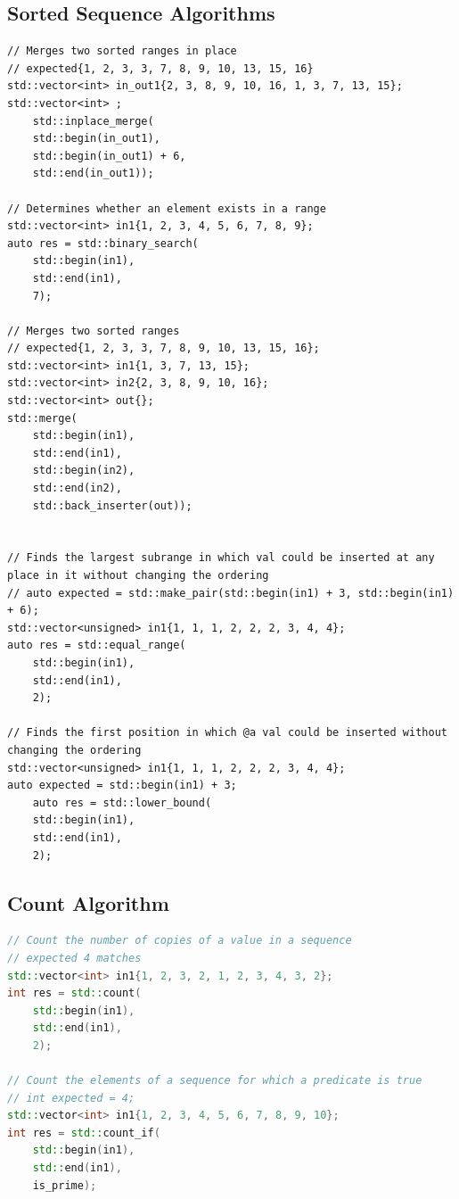 \subsection{Sorted Sequence Algorithms}
\begin{lstlisting}
// Merges two sorted ranges in place
// expected{1, 2, 3, 3, 7, 8, 9, 10, 13, 15, 16}
std::vector<int> in_out1{2, 3, 8, 9, 10, 16, 1, 3, 7, 13, 15};
std::vector<int> ;
	std::inplace_merge(
	std::begin(in_out1),
	std::begin(in_out1) + 6,
	std::end(in_out1));

// Determines whether an element exists in a range
std::vector<int> in1{1, 2, 3, 4, 5, 6, 7, 8, 9};
auto res = std::binary_search(
	std::begin(in1),
	std::end(in1),
	7);

// Merges two sorted ranges
// expected{1, 2, 3, 3, 7, 8, 9, 10, 13, 15, 16};
std::vector<int> in1{1, 3, 7, 13, 15};
std::vector<int> in2{2, 3, 8, 9, 10, 16};
std::vector<int> out{};
std::merge(
	std::begin(in1),
	std::end(in1),
	std::begin(in2),
	std::end(in2),
	std::back_inserter(out));


// Finds the largest subrange in which val could be inserted at any place in it without changing the ordering
// auto expected = std::make_pair(std::begin(in1) + 3, std::begin(in1) + 6);
std::vector<unsigned> in1{1, 1, 1, 2, 2, 2, 3, 4, 4};
auto res = std::equal_range(
	std::begin(in1),
	std::end(in1),
	2);

// Finds the first position in which @a val could be inserted without changing the ordering	
std::vector<unsigned> in1{1, 1, 1, 2, 2, 2, 3, 4, 4};
auto expected = std::begin(in1) + 3;
	auto res = std::lower_bound(
	std::begin(in1),
	std::end(in1),
	2);
\end{lstlisting}

\subsection{Count Algorithm}
\begin{lstlisting}[language=C++, caption=Count Algorithm]
// Count the number of copies of a value in a sequence
// expected 4 matches
std::vector<int> in1{1, 2, 3, 2, 1, 2, 3, 4, 3, 2};
int res = std::count(
	std::begin(in1),
	std::end(in1),
	2);

// Count the elements of a sequence for which a predicate is true
// int expected = 4;
std::vector<int> in1{1, 2, 3, 4, 5, 6, 7, 8, 9, 10};
int res = std::count_if(
	std::begin(in1),
	std::end(in1),
	is_prime);
\end{lstlisting}

